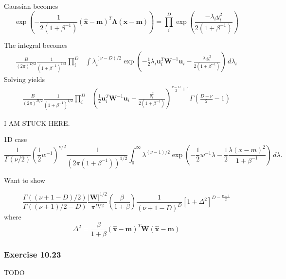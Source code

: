 \documentclass[12pt, a4paper]{article}
\newcommand{\vect}[1]{\bm{#1}}
\newcommand{\abs}[1]{\left\lvert#1\right\rvert}
\begin{document}
Gaussian becomes
\begin{equation*}
	\exp \left( 
	- \frac{1}{2 (1 + \beta^{-1})} ( \widehat{\vect{x}} - \vect{m} )^T
	\vect{\Lambda} 
	( \widehat{\vect{x}} - \vect{m} )  \right)
	=
	\prod_{i}^{D} \exp \left( 
	\frac{-\lambda_i y_i^2}{2 (1 + \beta^{-1})}  
	\right)
\end{equation*}

The integral becomes
\begin{align*}
\frac{B}{(2 \pi)^{D/2}}
\frac{1}{ (1 + \beta^{-1})^{1/2}}
\prod_i^D & \int   
\lambda_i^{(\nu - D)/2}
\exp \left( 
- \frac{1}{2} \lambda_i \vect{u}_i^T \vect{W}^{-1} \vect{u}_i
-\frac{\lambda_i y_i^2}{2 (1 + \beta^{-1})} 
 \right)
\, d \lambda_i
\end{align*}
Solving yields
\begin{align*}
\frac{B}{(2 \pi)^{D/2}}
\frac{1}{ (1 + \beta^{-1})^{1/2}}
\prod_i^D & 
\left( \frac{1}{2} \vect{u}_i^T \vect{W}^{-1} \vect{u}_i + 
\frac{ y_i^2}{2 (1 + \beta^{-1})} 
\right)^{\frac{\nu - D}{2} + 1}
\Gamma \left( \frac{D - \nu }{2} - 1 \right)
\end{align*}

I AM STUCK HERE.

1D case
\begin{equation}
\frac{1}{\Gamma(\nu/2)}
\left( \frac{1}{2} w^{-1} \right)^{\nu / 2}
\frac{1}{(2 \pi (1 + \beta^{-1}))^{1/2}}
\int_0^{\infty}
\lambda^{(\nu - 1)/2}
\exp\left( - \frac{1}{2} w^{-1} \lambda 
- \frac{1}{2} \frac{\lambda(x - m)^2 }{1 + \beta^{-1}}
\right)
\, d \lambda.
\end{equation}


Want to show

\begin{equation*}
	\frac{\Gamma((\nu + 1 - D)/2)}{\Gamma((\nu + 1)/2 - D)}
	\frac{\abs{\vect{W}}^{1/2}}{\pi^{D/2}}
	\left(\frac{\beta}{1 + \beta}\right) \frac{1}{(\nu + 1 - D)^D}
	\left[ 1 + \Delta^2 \right]^{D - \frac{\nu + 1}{2}}
\end{equation*}
where 
\begin{equation*}
	\Delta^2 = 
	\frac{\beta}{1 + \beta}
	( \widehat{\vect{x}} - \vect{m} )^T
	\vect{W}
	( \widehat{\vect{x}} - \vect{m} )
\end{equation*}




\subsubsection*{Exercise 10.23}
TODO
\end{document}
